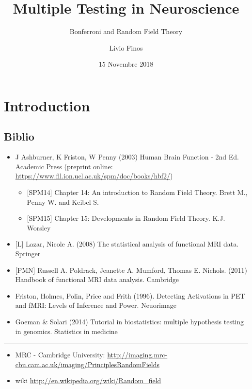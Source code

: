 \documentclass[]{article}
\title{Multiple Testing in Neuroscience}
\subtitle{Bonferroni and Random Field Theory}
\author{Livio Finos}
\date{15 Novembre 2018}
\providecommand{\tightlist}{%
  \setlength{\itemsep}{0pt}\setlength{\parskip}{0pt}}
\begin{document}
\maketitle

{
\setcounter{tocdepth}{2}
\tableofcontents
}
\section{Introduction}\label{introduction}

\subsection{Biblio}\label{biblio}

\begin{itemize}
\tightlist
\item
  J Ashburner, K Friston, W Penny (2003) Human Brain Function - 2nd Ed.
  Academic Press (preprint online:
  \url{https://www.fil.ion.ucl.ac.uk/spm/doc/books/hbf2/})

  \begin{itemize}
  \tightlist
  \item
    {[}SPM14{]} Chapter 14: An introduction to Random Field Theory.
    Brett M., Penny W. and Keibel S.
  \item
    {[}SPM15{]} Chapter 15: Developments in Random Field Theory. K.J.
    Worsley
  \end{itemize}
\item
  {[}L{]} Lazar, Nicole A. (2008) The statistical analysis of functional
  MRI data. Springer
\item
  {[}PMN{]} Russell A. Poldrack, Jeanette A. Mumford, Thomas E. Nichols.
  (2011) Handbook of functional MRI data analysis. Cambridge
\item
  Friston, Holmes, Polin, Price and Frith (1996). Detecting Activations
  in PET and fMRI: Levels of Inference and Power. Neuorimage
\item
  Goeman \& Solari (2014) Tutorial in biostatistics: multiple hypothesis
  testing in genomics. Statistics in medicine
\end{itemize}

\begin{center}\rule{0.5\linewidth}{\linethickness}\end{center}

\begin{itemize}
\tightlist
\item
  MRC - Cambridge University:
  \url{http://imaging.mrc-cbu.cam.ac.uk/imaging/PrinciplesRandomFields}
\item
  wiki \url{http://en.wikipedia.org/wiki/Random_field}
\end{itemize}
\end{document}
